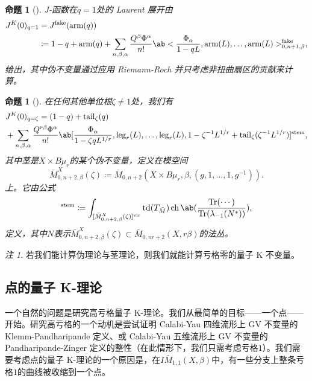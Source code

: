 \documentclass{amsart}
\newtheorem{prop}[thm]{命题}
\theoremstyle{definition}
\theoremstyle{remark}
\newtheorem{rmk}[thm]{注}
\theoremstyle{plain}
\theoremstyle{definition}
\theoremstyle{remark}
\newcommand{\mr}[1]{\mathrm{#1}}
\newcommand{\on}[1]{\operatorname{#1}}
\newcommand{\1}{\mathbf{1}}
\newcommand{\2}{\mathbf{2}}
\newcommand{\3}{\mathbf{3}}
\newcommand{\vir}{\mr{vir}}
\begin{document}
\begin{prop}[{\cite{GiventalTonita2014}}]
    J-函数在\(q = 1\)处的 Laurent 展开由
    \begin{align*}
        J^K(0)_{q=1} &= J^{\mr{fake}}(\mr{arm}(q)) \\
        &\coloneqq 1-q + \mr{arm}(q) + \sum_{n,\beta,\alpha} \frac{Q^{\beta}\Phi^{\alpha}}{n!} \ab<\frac{\Phi_{\alpha}}{1-qL}, \mr{arm}(L), \ldots, \mr{arm}(L)>_{0,n+1,\beta}^{\mr{fake}},
    \end{align*}
    给出，其中伪不变量通过应用 Riemann-Roch 并只考虑非扭曲扇区的贡献来计算。
\end{prop}

\begin{prop}[{\cite{GiventalTonita2014}}]
    在任何其他单位根\(\zeta \neq 1\)处，我们有
    \begin{align*}
        &J^K(0)_{q = \zeta} = (1-q) + \mr{tail}_{\zeta}(q) \\
        &+ \sum_{n,\beta,\alpha} \frac{Q^{r\beta}\Phi^{\alpha}}{n!} \ab[\frac{\Phi_{\alpha}}{1-\zeta q L^{1/r}}, \mr{leg}_r(L), \ldots, \mr{leg}_r(L), 1 - \zeta^{-1}L^{1/r} + \mr{tail}_{\zeta}(\zeta^{-1} L^{1/r})]^{\mr{stem}},
    \end{align*}
    其中茎是\(X \times B\mu_r\)的某个伪不变量，定义在模空间
    \[ \bar{M}_{0,n+2,\beta}^X(\zeta) \coloneqq \bar{M}_{0,n+2}(X \times B\mu_r, \beta, (g, 1, \ldots, 1, g^{-1})). \]
    上。它由公式
    \begin{align*}
        [\cdots]^{\mr{stem}} \coloneqq \int_{[\bar{M}_{0,n+2,\beta}^X(\zeta)]^{\vir}} \on{td}(T_{\bar{M}}) \on{ch}\ab(\frac{\on{Tr}(\cdots)}{\on{Tr}(\lambda_{-1}(N^*))}), 
    \end{align*}
    定义，其中\(N\)表示\(\bar{M}_{0,n+2,\beta}^X(\zeta) \subset \bar{M}_{0,nr+2}(X, r\beta)\)的法丛。
\end{prop}

\begin{rmk}
    若我们能计算伪理论与茎理论，则我们就能计算亏格零的量子 K 不变量。
\end{rmk}

\subsection{点的量子 K-理论}%
\label{sub:Quantum K-theory of a point}

一个自然的问题是研究高亏格量子 K-理论。我们从最简单的目标——一个点——开始。研究高亏格的一个动机是尝试证明 Calabi-Yau 四维流形上 GV 不变量的 Klemm-Pandharipande 定义、或 Calabi-Yau 五维流形上 GV 不变量的 Pandharipande-Zinger 定义的整性（在此情形下，我们只需考虑亏格\(1\)）。我们需要考虑点的量子 K-理论的一个原因是，在\(I\bar{M}_{1,1}(X, \beta)\)中，有一些分支上整条亏格\(1\)的曲线被收缩到一个点。
\end{document}
